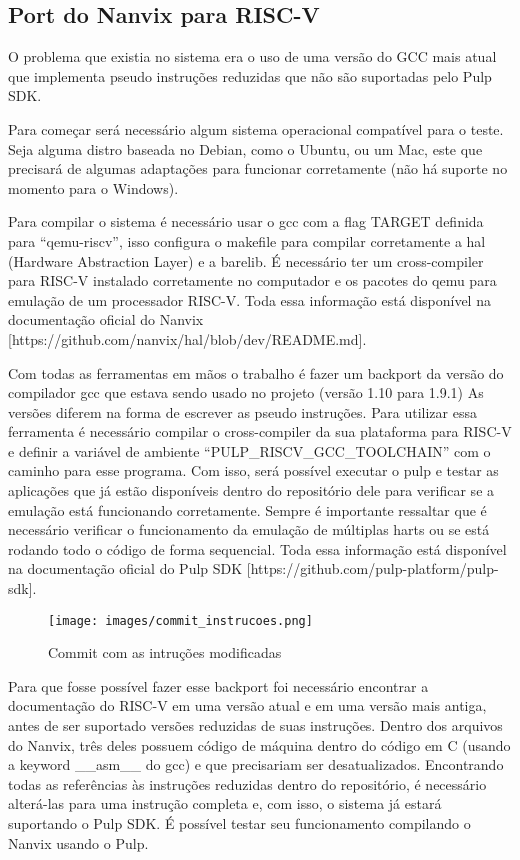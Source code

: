 \subsection{Port do Nanvix para RISC-V}

O problema que existia no sistema era o uso de uma versão do GCC mais atual que implementa pseudo instruções reduzidas que não são suportadas pelo Pulp SDK. 

Para começar será necessário algum sistema operacional compatível para o teste. Seja alguma distro baseada no Debian, como o Ubuntu, ou um Mac, este que 
precisará de algumas adaptações para funcionar corretamente (não há suporte no momento para o Windows). 

Para compilar o sistema é necessário usar o gcc com a flag TARGET definida para “qemu-riscv”, isso configura o makefile para compilar corretamente a 
hal (Hardware Abstraction Layer) e a barelib. É necessário ter um cross-compiler para RISC-V instalado corretamente no computador e os pacotes do qemu 
para emulação de um processador RISC-V. Toda essa informação está disponível na documentação oficial do Nanvix [https://github.com/nanvix/hal/blob/dev/README.md]. 

Com todas as ferramentas em mãos o trabalho é fazer um backport da versão do compilador gcc que estava sendo usado no projeto (versão 1.10 para 1.9.1) As versões 
diferem na forma de escrever as pseudo instruções. Para utilizar essa ferramenta é necessário compilar o cross-compiler da sua plataforma para RISC-V e definir a 
variável de ambiente “PULP\_RISCV\_GCC\_TOOLCHAIN” com o caminho para esse programa. Com isso, será possível executar o pulp e testar as aplicações que já estão 
disponíveis dentro do repositório dele para verificar se a emulação está funcionando corretamente. Sempre é importante ressaltar que é necessário verificar o 
funcionamento da emulação de múltiplas harts ou se está rodando todo o código de forma sequencial. Toda essa informação está disponível na documentação oficial 
do Pulp SDK [https://github.com/pulp-platform/pulp-sdk].

\begin{figure}[h!]
    \centering
    \texttt{[image: images/commit\_instrucoes.png]}
    \caption{Commit com as intruções modificadas \\ \cite{SolucaoInstrucoesDOWNGrade}} %
\end{figure}

Para que fosse possível fazer esse backport foi necessário encontrar a documentação do RISC-V em uma versão atual e em uma versão mais antiga, antes de ser suportado 
versões reduzidas de suas instruções. Dentro dos arquivos do Nanvix, três deles  possuem código de máquina dentro do código em C (usando a keyword \_\_asm\_\_ do gcc) 
e que precisariam ser desatualizados. Encontrando todas as referências às instruções reduzidas dentro do repositório, é necessário alterá-las para uma instrução completa
e, com isso, o sistema já estará suportando o Pulp SDK. É possível testar seu funcionamento compilando o Nanvix usando o Pulp.

